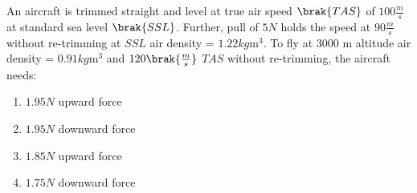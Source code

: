     \item An aircraft is trimmed straight and level at true air speed $\brak{TAS}$ of $100 \frac{m}{s}$ at standard sea level $\brak{SSL}$. Further, pull of $5 N$ holds the speed at $90 \frac{m}{s}$ without re-trimming at $SSL$ air density = $1.22 kg \text{m}^3$. To fly at 3000 m altitude air density = $0.91 kg \text{m}^3$ and $120 \brak{\frac{m}{s}}$ $TAS$ without re-trimming, the aircraft needs:
    \begin{enumerate}
        \item $1.95 N$ upward force
        \item $1.95 N$ downward force
        \item $1.85 N$ upward force
        \item $1.75 N$ downward force
    \end{enumerate}
    
   





